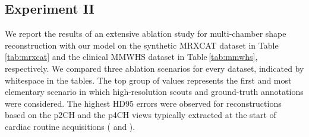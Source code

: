     \subsection{Experiment II}
     We report the results of an extensive ablation study for multi-chamber shape reconstruction with our model on the synthetic MRXCAT dataset in Table\,\ref{tab:mrxcat} and the clinical MMWHS dataset in Table\,\ref{tab:mmwhs}, respectively.
    We compared three ablation scenarios for every dataset, indicated by whitespace in the tables.
    The top group of values represents the first and most elementary scenario in which high-resolution scouts and ground-truth annotations were considered.
    The highest HD95 errors were observed for reconstructions based on the p2CH and the p4CH views typically extracted at the start of cardiac routine acquisitions ( and ).


